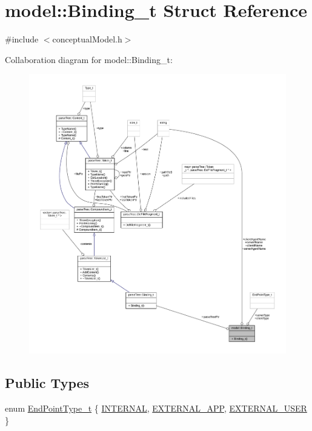 \hypertarget{structmodel_1_1_binding__t}{}\section{model\+:\+:Binding\+\_\+t Struct Reference}
\label{structmodel_1_1_binding__t}


{\ttfamily \#include $<$conceptual\+Model.\+h$>$}



Collaboration diagram for model\+:\+:Binding\+\_\+t\+:
\nopagebreak
\begin{figure}[H]
\begin{center}
\leavevmode
\includegraphics[width=350pt]{structmodel_1_1_binding__t__coll__graph}
\end{center}
\end{figure}
\subsection*{Public Types}
\begin{DoxyCompactItemize}
\item 
enum \hyperlink{structmodel_1_1_binding__t_a52144bd55340eb27c7a2446d8bd41909}{End\+Point\+Type\+\_\+t} \{ \hyperlink{structmodel_1_1_binding__t_a52144bd55340eb27c7a2446d8bd41909a7b69d424b52263c97559da3331a476d0}{I\+N\+T\+E\+R\+N\+AL}, 
\hyperlink{structmodel_1_1_binding__t_a52144bd55340eb27c7a2446d8bd41909a8c9fcee6015014e2962d6a1907301bb7}{E\+X\+T\+E\+R\+N\+A\+L\+\_\+\+A\+PP}, 
\hyperlink{structmodel_1_1_binding__t_a52144bd55340eb27c7a2446d8bd41909a2e09cc77c18796161e1e2c44ade1b414}{E\+X\+T\+E\+R\+N\+A\+L\+\_\+\+U\+S\+ER}
 \}
\end{DoxyCompactItemize}
